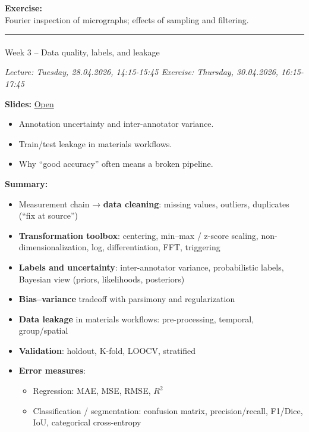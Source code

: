 \documentclass[
]{agujournal2019}
\makeatletter
\let\oldparagraph\paragraph
\renewcommand{\paragraph}{
    \@ifstar
      \xxxParagraphStar
      \xxxParagraphNoStar
  }
\newcommand{\xxxParagraphStar}[1]{\oldparagraph*{#1}\mbox{}}
\newcommand{\xxxParagraphNoStar}[1]{\oldparagraph{#1}\mbox{}}
\providecommand{\tightlist}{%
  \setlength{\itemsep}{0pt}\setlength{\parskip}{0pt}}
\makeatother
\begin{document}
\textbf{Exercise:}\\
Fourier inspection of micrographs; effects of sampling and filtering.

\begin{center}\rule{0.5\linewidth}{0.5pt}\end{center}

\paragraph{Week 3 -- Data quality, labels, and
leakage}\label{week-3-data-quality-labels-and-leakage}

\emph{Lecture: Tuesday, 28.04.2026, 14:15-15:45 \textbar{} Exercise:
Thursday, 30.04.2026, 16:15-17:45}

\textbf{Slides:}
\href{https://pelzlab.science/public_presentations/ml_for_characterization_and_processing/unit03_data_quality/01_intro.html}{Open}

\begin{itemize}
\tightlist
\item
  Annotation uncertainty and inter-annotator variance.
\item
  Train/test leakage in materials workflows.
\item
  Why ``good accuracy'' often means a broken pipeline.
\end{itemize}

\textbf{Summary:}

\begin{itemize}
\tightlist
\item
  Measurement chain → \textbf{data cleaning}: missing values, outliers,
  duplicates (``fix at source'')
\item
  \textbf{Transformation toolbox}: centering, min--max / z-score
  scaling, non-dimensionalization, log, differentiation, FFT, triggering
\item
  \textbf{Labels and uncertainty}: inter-annotator variance,
  probabilistic labels, Bayesian view (priors, likelihoods, posteriors)
\item
  \textbf{Bias--variance} tradeoff with parsimony and regularization
\item
  \textbf{Data leakage} in materials workflows: pre-processing,
  temporal, group/spatial
\item
  \textbf{Validation}: holdout, K-fold, LOOCV, stratified
\item
  \textbf{Error measures}:

  \begin{itemize}
  \tightlist
  \item
    Regression: MAE, MSE, RMSE, \(R^2\)
  \item
    Classification / segmentation: confusion matrix, precision/recall,
    F1/Dice, IoU, categorical cross-entropy
  \end{itemize}
\end{itemize}
\end{document}
